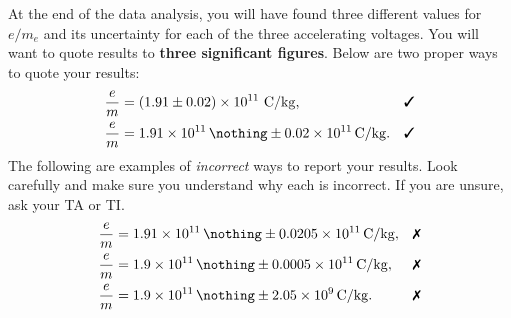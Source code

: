 \documentclass[addpoints]{physlabs}
\newcommand{\cmark}{\ding{51}}%
\newcommand{\xmark}{\ding{55}}
\begin{document}
\begin{labsection}
\begin{experiment}
    At the end of the data analysis, you will have found three different values for $e/m_e$ and its uncertainty for each of the three accelerating voltages. You will want to quote results to \textbf{three significant figures}. Below are two proper ways to quote your results:
    \begin{align*}
        \frac{e}{m} &= (1.91\pm0.02)\times10^{11}~\qty{}{\coulomb/\kilo\gram}, & & \text{\cmark}
        \\
        \frac{e}{m} &= \qty{1.91e11}{\nothing} \pm \qty{0.02e11}{\coulomb/\kilo\gram}. & & \text{\cmark}
    \end{align*}
    The following are examples of \textsl{incorrect} ways to report your results. Look carefully and make sure you understand why each is incorrect. If you are unsure, ask your TA or TI.
    \begin{align*}
        \frac{e}{m} &= \qty{1.91e11}{\nothing} \pm \qty{0.0205e11}{\coulomb/\kilo\gram}, & &\text{\xmark}
        \\
        \frac{e}{m} &= \qty{1.9e11}{\nothing} \pm \qty{0.0005e11}{\coulomb/\kilo\gram}, & &\text{\xmark}
        \\
        \frac{e}{m} &= \qty{1.9e11}{\nothing} \pm \qty{2.05e9}{\coulomb/\kilo\gram}. & &\text{\xmark}
        \\
    \end{align*}
    
\end{experiment}

\end{labsection}
\end{document}
